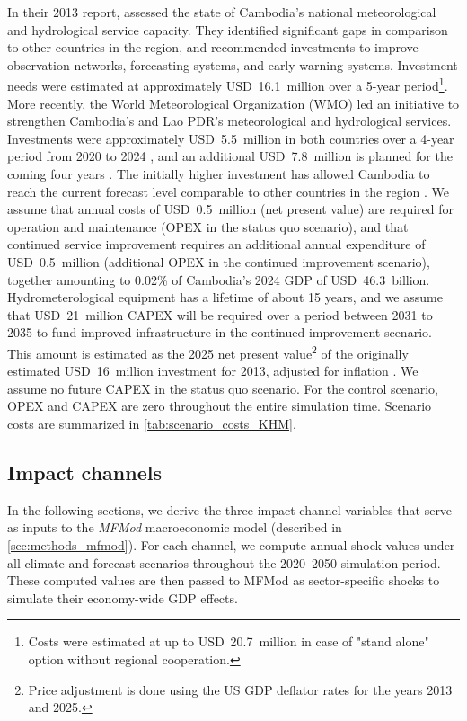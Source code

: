 \documentclass[
  final,
  10pt,
  letterpaper,
  english,
]{article}
\begin{document}
\noindent
In their 2013 report, \cite{WorldBank2013CambodiaHydroMet} assessed the state of
Cambodia's national meteorological and hydrological service capacity. They
identified significant gaps in comparison to other countries in the region, and
recommended investments to improve observation networks, forecasting systems,
and early warning systems. Investment needs were estimated at approximately
USD~16.1~million over a 5-year period\footnote{Costs were estimated at up to
USD~20.7~million in case of "stand alone" option without regional cooperation.}.
More recently, the World Meteorological Organization (WMO) led an initiative to
strengthen Cambodia's and Lao PDR's meteorological and hydrological services.
Investments were approximately USD~5.5~million in both countries over a 4-year
period from 2020 to 2024 \parencite{preventionweb2025lao_cambodia_project}, and
an additional USD~7.8~million is planned for the coming four years
\parencite{crews2025sea2_project}. The initially higher investment has allowed
Cambodia to reach the current forecast level comparable to other countries in
the region \parencite{chd2024cambodia}. We assume that annual costs of
USD~0.5~million (net present value) are required for operation and maintenance
(OPEX in the status quo scenario), and that continued service improvement
requires an additional annual expenditure of USD~0.5~million (additional OPEX in
the continued improvement scenario), together amounting to 0.02\% of Cambodia's
2024 GDP of USD~46.3~billion. Hydrometerological equipment has a lifetime of
about 15 years, and we assume that USD~21~million CAPEX will be required over a
period between 2031 to 2035 to fund improved infrastructure in the continued
improvement scenario. This amount is estimated as the 2025 net present
value\footnote{Price adjustment is done using the US GDP deflator rates for the
years 2013 and 2025.} of the originally estimated USD~16~million investment for
2013, adjusted for inflation \parencite{us2025deflator}. We assume no future
CAPEX in the status quo scenario. For the control scenario, OPEX and CAPEX are
zero throughout the entire simulation time. Scenario costs are summarized in
\cref{tab:scenario_costs_KHM}.

 


\subsection{Impact channels}
\label{sec:methods_impact_channels}
In the following sections, we derive the three impact channel variables that
serve as inputs to the \textit{MFMod} macroeconomic model (described in
\cref{sec:methods_mfmod}). For each channel, we compute annual shock values
under all climate and forecast scenarios throughout the 2020--2050 simulation
period. These computed values are then passed to MFMod as sector-specific shocks
to simulate their economy-wide GDP effects.
\end{document}

